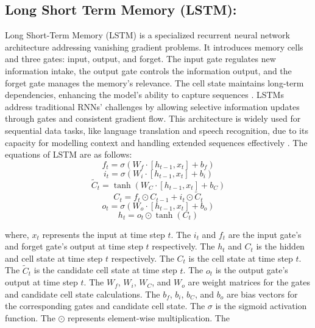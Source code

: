\documentclass[sn-mathphys,Numbered]{sn-jnl}
\theoremstyle{thmstyleone}
\theoremstyle{thmstyletwo}
\theoremstyle{thmstylethree}
\begin{document}
\subsection{Long Short Term Memory (LSTM):}
Long Short-Term Memory (LSTM) is a specialized recurrent neural network architecture addressing vanishing gradient problems. It introduces memory cells and three gates: input, output, and forget. The input gate regulates new information intake, the output gate controls the information output, and the forget gate manages the memory's relevance. The cell state maintains long-term dependencies, enhancing the model's ability to capture sequences \cite{guillen2020deep}. LSTMs address traditional RNNs' challenges by allowing selective information updates through gates and consistent gradient flow. This architecture is widely used for sequential data tasks, like language translation and speech recognition, due to its capacity for modelling context and handling extended sequences effectively \cite{qiu2021river}. The equations of LSTM are as follows:
\begin{equation}
f_t = \sigma(W_f \cdot [h_{t-1}, x_t] + b_f)
\end{equation}
\begin{equation}
i_t = \sigma(W_i \cdot [h_{t-1}, x_t] + b_i)
\end{equation}
\begin{equation}
\tilde{C}_t = \tanh(W_C \cdot [h_{t-1}, x_t] + b_C)
\end{equation}
\begin{equation}
C_t = f_t \odot C_{t-1} + i_t \odot \tilde{C}_t
\end{equation}
\begin{equation}
o_t = \sigma(W_o \cdot [h_{t-1}, x_t] + b_o)
\end{equation}
\begin{equation}
h_t = o_t \odot \tanh(C_t)
\end{equation}


where, \(x_t\) represents the input at time step \(t\). The
\(i_t\) and \(f_t\) are the input gate's and forget gate's output at time step \(t\) respectively. The
\(h_t\) and \(C_t\) is the hidden and cell state at time step \(t\) respectively. The
\(C_t\) is the cell state at time step \(t\). The
\(\tilde{C}_t\) is the candidate cell state at time step \(t\). The
\(o_t\) is the output gate's output at time step \(t\). The
\(W_f\), \(W_i\), \(W_C\), and \(W_o\) are weight matrices for the gates and candidate cell state calculations. The
\(b_f\), \(b_i\), \(b_C\), and \(b_o\) are bias vectors for the corresponding gates and candidate cell state. The
\(\sigma\) is the sigmoid activation function. The
\(\odot\) represents element-wise multiplication. The
\end{document}
